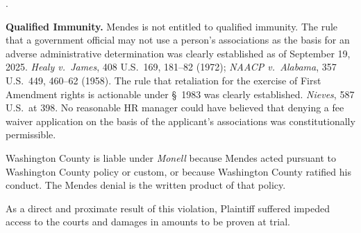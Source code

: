\documentclass[12pt,letterpaper]{article}
\newcounter{complaintpara}
\newenvironment{paras}{%
	\begin{list}{\arabic{complaintpara}.}{%
			\setlength{\leftmargin}{0.5in}%
			\setlength{\labelwidth}{0.4in}%
			\setlength{\labelsep}{0.1in}%
			\setlength{\itemsep}{0pt}%
			\setlength{\parsep}{0pt}%
			\setlength{\topsep}{6pt}%
		}%
	}{%
	\end{list}%
}
\newcommand{\sect}{§}
\begin{document}
\begin{paras}
		\item \textbf{Qualified Immunity.} Mendes is not entitled to
		qualified immunity. The rule that a government official may
		not use a person's associations as the basis for an adverse
		administrative determination was clearly established as of
		September 19, 2025. \textit{Healy v.\ James}, 408 U.S.\ 169,
		181--82 (1972); \textit{NAACP v.\ Alabama}, 357 U.S.\ 449,
		460--62 (1958). The rule that retaliation for the exercise of
		First Amendment rights is actionable under \sect\ 1983 was
		clearly established. \textit{Nieves}, 587 U.S.\ at 398. No
		reasonable HR manager could have believed that denying a fee
		waiver application on the basis of the applicant's
		associations was constitutionally permissible.
		
		\item Washington County is liable under \textit{Monell} because
		Mendes acted pursuant to Washington County policy or custom,
		or because Washington County ratified his conduct. The Mendes
		denial is the written product of that policy.
		
		\item As a direct and proximate result of this violation,
		Plaintiff suffered impeded access to the courts and damages
		in amounts to be proven at trial.
		
	\end{paras}
\end{document}
